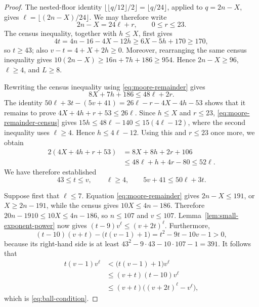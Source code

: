 \begin{proof}
The nested-floor identity
\(\lfloor\lfloor q/12\rfloor/2\rfloor=\lfloor q/24\rfloor\), applied to
\(q=2n-X\), gives \(\ell=\lfloor(2n-X)/24\rfloor\).  We may therefore write
\begin{equation}\label{eq:moore-remainder}
 2n-X=24\ell+r,\qquad 0\le r\le23.
\end{equation}
The census inequality, together with \(h\le X\), first gives
\[
 4t=4n-16-4X-12h\ge6X-5h+170\ge170,
\]
so \(t\ge43\); also \(v-t=4+X+2h\ge0\).  Moreover,
rearranging the same census inequality gives
\(10(2n-X)\ge16n+7h+186\ge954\).  Hence
\(2n-X\ge96\), \(\ell\ge4\), and \(L\ge8\).

Rewriting the census inequality using \eqref{eq:moore-remainder} gives
\begin{equation}\label{eq:moore-remainder-census}
 8X+7h+186\le48\ell+2r.
\end{equation}
The identity \(50\ell+3t-(5v+41)=26\ell-r-4X-4h-53\) shows that it remains
to prove \(4X+4h+r+53\le26\ell\).  Since \(h\le X\)
and \(r\le23\), \eqref{eq:moore-remainder-census} gives
\(15h\le48\ell-140\le15(4\ell-12)\), where the second inequality uses
\(\ell\ge4\).  Hence \(h\le4\ell-12\).
Using this and \(r\le23\) once more, we obtain
\[
\begin{aligned}
 2(4X+4h+r+53)
 &=8X+8h+2r+106\\
 &\le48\ell+h+4r-80\le52\ell.
\end{aligned}
\]
We have therefore established
\begin{equation}\label{eq:moore-region}
 43\le t\le v,\qquad \ell\ge4,\qquad
 5v+41\le50\ell+3t.
\end{equation}

Suppose first that \(\ell\le7\).  Equation
\eqref{eq:moore-remainder} gives \(2n-X\le191\), or
\(X\ge2n-191\), while the census gives \(10X\le4n-186\).  Therefore
\(20n-1910\le10X\le4n-186\), so \(n\le107\) and \(v\le107\).
Lemma~\ref{lem:small-exponent-power} now gives
\((t-9)v^\ell\le(v+2t)^\ell\).  Furthermore,
\[
 (t-10)(v+t)-\bigl(t(v-1)+1\bigr)
 =t^2-9t-10v-1>0,
\]
because its right-hand side is at least
\(43^2-9\cdot43-10\cdot107-1=391\).  It follows that
\[
\begin{aligned}
 t(v-1)v^\ell
 &<\bigl(t(v-1)+1\bigr)v^\ell\\
 &\le(v+t)(t-10)v^\ell\\
 &\le(v+t)\bigl((v+2t)^\ell-v^\ell\bigr),
\end{aligned}
\]
which is \eqref{eq:ball-condition}.


\end{proof}
